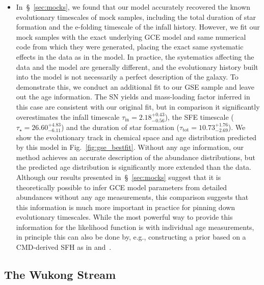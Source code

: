 \documentclass[ms.tex]{subfiles}
\begin{document}
\begin{itemize}
	\item In~\S~\ref{sec:mocks}, we found that our model accurately
	recovered the known evolutionary timescales of mock samples, including the
	total duration of star formation and the e-folding timescale of the infall
	history.
	However, we fit our mock samples with the exact underlying GCE model and
	same numerical code from which they were generated, placing the exact same
	systematic effects in the data as in the model.
	In practice, the systematics affecting the data and the model are generally
	different, and the evolutionary history built into the model is not
	necessarily a perfect description of the galaxy.
	To demonstrate this, we conduct an additional fit to our GSE sample and
	leave out the age information.
	The SN yields and mass-loading factor inferred in this case are
	consistent with our original fit, but in comparison it significantly
	overestimates the infall timescale 
	$\tau_\text{in} = 2.18^{+0.43}_{-0.56}$), the SFE timescale
	($\tau_\star = 26.60^{+4.83}_{-6.11}$) and the duration of star formation
	($\tau_\text{tot} = 10.73^{+1.76}_{-2.69}$).
	We show the evolutionary track in chemical space and age distribution
	predicted by this model in Fig.~\ref{fig:gse_bestfit}.
	Without any age information, our method achieves an accurate description of
	the abundance distributions, but the predicted age distribution is
	significantly more extended than the data.
	Although our results presented in~\S~\ref{sec:mocks} suggest that it
	is theoretically possible to infer GCE model parameters from detailed
	abundances without any age measurements, this comparison suggests that this
	information is much more important in practice for pinning down
	evolutionary timescales.
	While the most powerful way to provide this information for the likelihood
	function is with individual age measurements, in principle this can also
	be done by, e.g., constructing a prior based on a CMD-derived SFH as in
	\citet{Dolphin2002} and~\citet{Weisz2014b}.

\end{itemize}

\subsection{The Wukong Stream}
\label{sec:h3:wukong}
\end{document}
